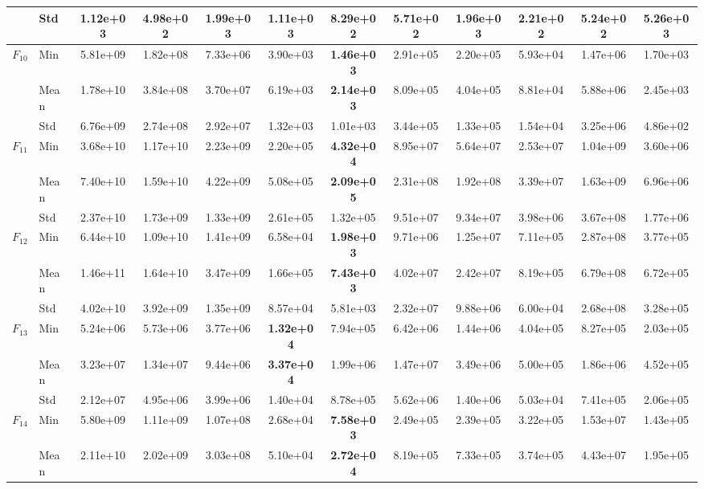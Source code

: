\begin{center}
\begin{longtable}{clcccccccccc}
 & Std & 1.12e+03 & 4.98e+02 & 1.99e+03 & 1.11e+03 & 8.29e+02 & 5.71e+02 & 1.96e+03 & 2.21e+02 & 5.24e+02 & 5.26e+03 \\
\midrule
\multirow{3}{*}{$F_{10}$} & Min & 5.81e+09 & 1.82e+08 & 7.33e+06 & 3.90e+03 & \textbf{1.46e+03} & 2.91e+05 & 2.20e+05 & 5.93e+04 & 1.47e+06 & 1.70e+03 \\
 & Mean & 1.78e+10 & 3.84e+08 & 3.70e+07 & 6.19e+03 & \textbf{2.14e+03} & 8.09e+05 & 4.04e+05 & 8.81e+04 & 5.88e+06 & 2.45e+03 \\
 & Std & 6.76e+09 & 2.74e+08 & 2.92e+07 & 1.32e+03 & 1.01e+03 & 3.44e+05 & 1.33e+05 & 1.54e+04 & 3.25e+06 & 4.86e+02 \\
\midrule
\multirow{3}{*}{$F_{11}$} & Min & 3.68e+10 & 1.17e+10 & 2.23e+09 & 2.20e+05 & \textbf{4.32e+04} & 8.95e+07 & 5.64e+07 & 2.53e+07 & 1.04e+09 & 3.60e+06 \\
 & Mean & 7.40e+10 & 1.59e+10 & 4.22e+09 & 5.08e+05 & \textbf{2.09e+05} & 2.31e+08 & 1.92e+08 & 3.39e+07 & 1.63e+09 & 6.96e+06 \\
 & Std & 2.37e+10 & 1.73e+09 & 1.33e+09 & 2.61e+05 & 1.32e+05 & 9.51e+07 & 9.34e+07 & 3.98e+06 & 3.67e+08 & 1.77e+06 \\
\midrule
\multirow{3}{*}{$F_{12}$} & Min & 6.44e+10 & 1.09e+10 & 1.41e+09 & 6.58e+04 & \textbf{1.98e+03} & 9.71e+06 & 1.25e+07 & 7.11e+05 & 2.87e+08 & 3.77e+05 \\
 & Mean & 1.46e+11 & 1.64e+10 & 3.47e+09 & 1.66e+05 & \textbf{7.43e+03} & 4.02e+07 & 2.42e+07 & 8.19e+05 & 6.79e+08 & 6.72e+05 \\
 & Std & 4.02e+10 & 3.92e+09 & 1.35e+09 & 8.57e+04 & 5.81e+03 & 2.32e+07 & 9.88e+06 & 6.00e+04 & 2.68e+08 & 3.28e+05 \\
\midrule
\multirow{3}{*}{$F_{13}$} & Min & 5.24e+06 & 5.73e+06 & 3.77e+06 & \textbf{1.32e+04} & 7.94e+05 & 6.42e+06 & 1.44e+06 & 4.04e+05 & 8.27e+05 & 2.03e+05 \\
 & Mean & 3.23e+07 & 1.34e+07 & 9.44e+06 & \textbf{3.37e+04} & 1.99e+06 & 1.47e+07 & 3.49e+06 & 5.00e+05 & 1.86e+06 & 4.52e+05 \\
 & Std & 2.12e+07 & 4.95e+06 & 3.99e+06 & 1.40e+04 & 8.78e+05 & 5.62e+06 & 1.40e+06 & 5.03e+04 & 7.41e+05 & 2.06e+05 \\
\midrule
\multirow{3}{*}{$F_{14}$} & Min & 5.80e+09 & 1.11e+09 & 1.07e+08 & 2.68e+04 & \textbf{7.58e+03} & 2.49e+05 & 2.39e+05 & 3.22e+05 & 1.53e+07 & 1.43e+05 \\
 & Mean & 2.11e+10 & 2.02e+09 & 3.03e+08 & 5.10e+04 & \textbf{2.72e+04} & 8.19e+05 & 7.33e+05 & 3.74e+05 & 4.43e+07 & 1.95e+05 \\

\end{longtable}
\end{center}
